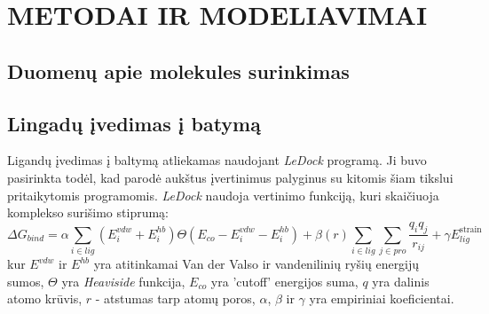 

\section{METODAI IR MODELIAVIMAI}

\subsection{Duomenų apie molekules surinkimas}



\subsection{Lingadų įvedimas į batymą}

Ligandų įvedimas į baltymą atliekamas naudojant \emph{LeDock} programą. Ji buvo pasirinkta todėl, kad parodė aukštus įvertinimus palyginus su kitomis šiam tikslui pritaikytomis programomis.\cite{} \emph{LeDock} naudoja vertinimo funkciją, kuri skaičiuoja komplekso surišimo stiprumą: %
\begin{equation}
\Delta G_{bind}=\alpha \sum_{i \in lig}\left(E_{i}^{vdw}+E_{i}^{hb}\right) \Theta\left(E_{c o}-E_{i}^{v d w}-E_{i}^{h b}\right)+\beta(r) \sum_{i \in lig} \sum_{j \in pro} \frac{q_{i} q_{j}}{r_{i j}}+\gamma E_{lig}^{\text {strain}}
\end{equation}
kur $E^{vdw}$ ir $E^{hb}$ yra atitinkamai Van der Valso ir vandenilinių ryšių energijų sumos, $\Theta$ yra \emph{Heaviside} funkcija, $E_{co}$ yra 'cutoff'  energijos suma, $q$ yra dalinis atomo krūvis, $r$ - atstumas tarp atomų poros, $\alpha$, $\beta$ ir $\gamma$ yra empiriniai koeficientai.


